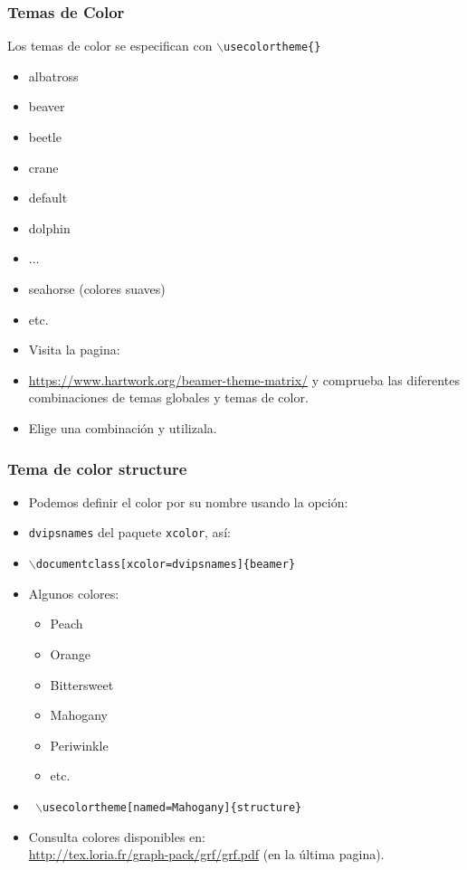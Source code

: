 \documentclass[aspectratio=1610]{beamer}%
\begin{document}
\begin{frame}[fragile]
\frametitle{\textbf{Temas de Color}}
\justifying
 Los temas de color se especifican con \texttt{$\backslash$usecolortheme\{\}}
 
 \begin{itemize}\justifying
  \item albatross
  \item beaver
  \item beetle
  \item crane
  \item default
  \item dolphin
  \item$\dots$
  \item seahorse (colores suaves)
  \item etc.
\end{itemize}
\begin{block}{}
\begin{itemize}\justifying
  \item Visita la pagina:
  \item []\url{https://www.hartwork.org/beamer-theme-matrix/} y comprueba las diferentes combinaciones de temas globales y temas de color.
  \item Elige una combinación y utilizala.
\end{itemize}

\end{block}

\end{frame}

\begin{frame}[fragile]
\frametitle{\textbf{Tema de color structure}}
\justifying
 \begin{itemize}\justifying
  \item Podemos definir el color por su nombre usando la opción:
  \item [] \texttt{dvipsnames} del paquete \texttt{xcolor}, así:
  \item [] \texttt{$\backslash$documentclass[xcolor=dvipsnames]\{beamer\}}
  \item Algunos colores:
  \begin{itemize}\justifying
  \item Peach
  \item Orange
  \item Bittersweet
  \item Mahogany
  \item Periwinkle
  \item etc.
\end{itemize}
\item[] \texttt{
$\backslash$usecolortheme[named=Mahogany]\{structure\}}
\item Consulta colores disponibles en:\\
\url{http://tex.loria.fr/graph-pack/grf/grf.pdf} (en la última pagina).
\end{itemize}

\end{frame}
\end{document}

